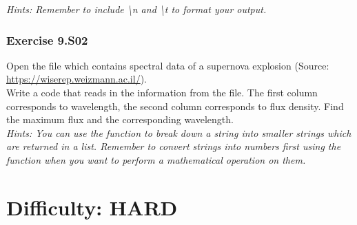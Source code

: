 \textit{Hints:
Remember to include \textbackslash n and \textbackslash t to format your output.}\\[1cm]


\subsubsection*{Exercise 9.S02}
Open the file {} which contains spectral data of a supernova
explosion (Source: \url{https://wiserep.weizmann.ac.il/}).\\
Write a code that reads in the information from the file. The first column corresponds to
wavelength, the second column corresponds to flux density. Find the maximum flux and the
corresponding wavelength.\\


\textit{Hints:
You can use the {} function to break down a string into smaller strings which are returned in a list. Remember to convert strings into numbers first using the {} function when you want to perform a mathematical operation on them.}






\newpage
\section{Difficulty: HARD}

